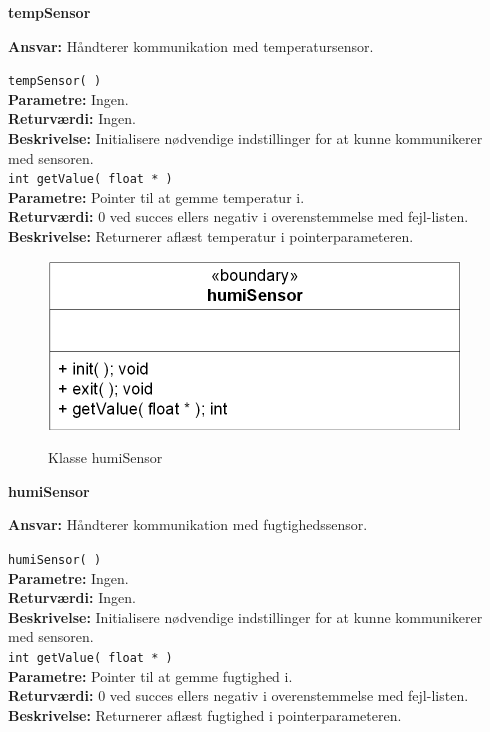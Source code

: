 {\centering
\textbf{tempSensor}\par
}
\textbf{Ansvar:} Håndterer kommunikation med temperatursensor. \

\verb+tempSensor( )+ \\
\textbf{Parametre:} Ingen. \\
\textbf{Returværdi:} Ingen. \\
\textbf{Beskrivelse:} Initialisere nødvendige indstillinger for at kunne kommunikerer med sensoren. \\

\verb+int getValue( float * )+ \\
\textbf{Parametre:} Pointer til at gemme temperatur i. \\
\textbf{Returværdi:} 0 ved succes ellers negativ i overenstemmelse med fejl-listen. \\
\textbf{Beskrivelse:} Returnerer aflæst temperatur i pointerparameteren. \\


\begin{figure}[htbp] \centering
{\includegraphics[scale=1.3]{filer/design/Klassediagrammer/sw_psoc_humiSensor}}
\caption{Klasse humiSensor}
\label{fig:sw_psoc_class_humiSensor}
\end{figure} 

{\centering
\textbf{humiSensor}\par
}
\textbf{Ansvar:} Håndterer kommunikation med fugtighedssensor. \

\verb+humiSensor( )+ \\
\textbf{Parametre:} Ingen. \\
\textbf{Returværdi:} Ingen. \\
\textbf{Beskrivelse:} Initialisere nødvendige indstillinger for at kunne kommunikerer med sensoren. \\

\verb+int getValue( float * )+ \\
\textbf{Parametre:} Pointer til at gemme fugtighed i. \\
\textbf{Returværdi:} 0 ved succes ellers negativ i overenstemmelse med fejl-listen. \\
\textbf{Beskrivelse:} Returnerer aflæst fugtighed i pointerparameteren. \\

